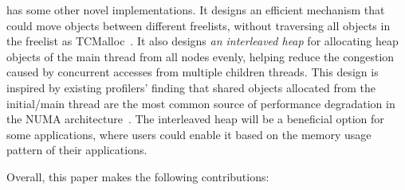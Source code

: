 \NM{} has some other novel implementations. It designs an efficient mechanism that could move objects between different freelists, without traversing all objects in the freelist as TCMalloc~\cite{tcmalloc}. It also designs \textit{an interleaved heap} for allocating heap objects of the main thread from all nodes evenly, helping reduce the congestion caused by concurrent accesses from multiple children threads. This design is inspired by existing profilers' finding that shared objects allocated from the initial/main thread are the most common source of performance degradation in the NUMA architecture~\cite{XuNuma, MemProf}. The interleaved heap will be a beneficial option for some applications, where users could enable it based on the memory usage pattern of their applications. 



Overall, this paper makes the following contributions:

